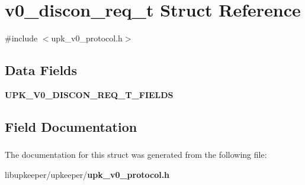 \section{v0\_\-discon\_\-req\_\-t Struct Reference}
\label{structv0__discon__req__t}


{\ttfamily \#include $<$upk\_\-v0\_\-protocol.h$>$}

\subsection*{Data Fields}
\begin{DoxyCompactItemize}
\item 
{\bf UPK\_\-V0\_\-DISCON\_\-REQ\_\-T\_\-FIELDS}
\end{DoxyCompactItemize}


\subsection{Field Documentation}
\subsubsection[{UPK\_\-V0\_\-DISCON\_\-REQ\_\-T\_\-FIELDS}]{}\label{structv0__discon__req__t_ac521a6f39e2cf432cbddb23391518089}


The documentation for this struct was generated from the following file:\begin{DoxyCompactItemize}
\item 
libupkeeper/upkeeper/{\bf upk\_\-v0\_\-protocol.h}\end{DoxyCompactItemize}
